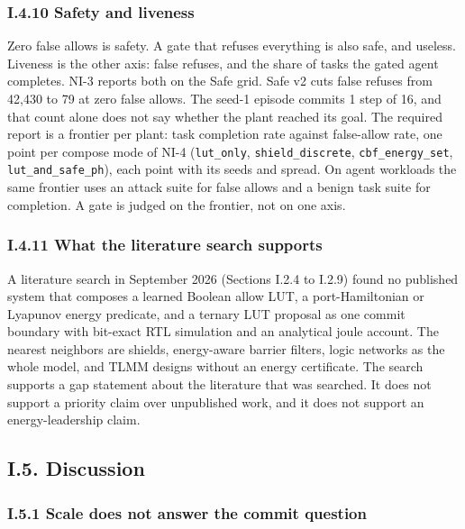 \documentclass[
  10pt,
]{article}
\begin{document}
\subsubsection{I.4.10 Safety and
liveness}\label{i.4.10-safety-and-liveness}

Zero false allows is safety. A gate that refuses everything is also
safe, and useless. Liveness is the other axis: false refuses, and the
share of tasks the gated agent completes. NI-3 reports both on the Safe
grid. Safe v2 cuts false refuses from 42,430 to 79 at zero false allows.
The seed-1 episode commits 1 step of 16, and that count alone does not
say whether the plant reached its goal. The required report is a
frontier per plant: task completion rate against false-allow rate, one
point per compose mode of NI-4 (\texttt{lut\_only},
\texttt{shield\_discrete}, \texttt{cbf\_energy\_set},
\texttt{lut\_and\_safe\_ph}), each point with its seeds and spread. On
agent workloads the same frontier uses an attack suite for false allows
and a benign task suite for completion. A gate is judged on the
frontier, not on one axis.

\subsubsection{I.4.11 What the literature search
supports}\label{i.4.11-what-the-literature-search-supports}

A literature search in September 2026 (Sections I.2.4 to I.2.9) found no
published system that composes a learned Boolean allow LUT, a
port-Hamiltonian or Lyapunov energy predicate, and a ternary LUT
proposal as one commit boundary with bit-exact RTL simulation and an
analytical joule account. The nearest neighbors are shields,
energy-aware barrier filters, logic networks as the whole model, and
TLMM designs without an energy certificate. The search supports a gap
statement about the literature that was searched. It does not support a
priority claim over unpublished work, and it does not support an
energy-leadership claim.

\subsection{I.5. Discussion}\label{i.5.-discussion}

\subsubsection{I.5.1 Scale does not answer the commit
question}\label{i.5.1-scale-does-not-answer-the-commit-question}
\end{document}
